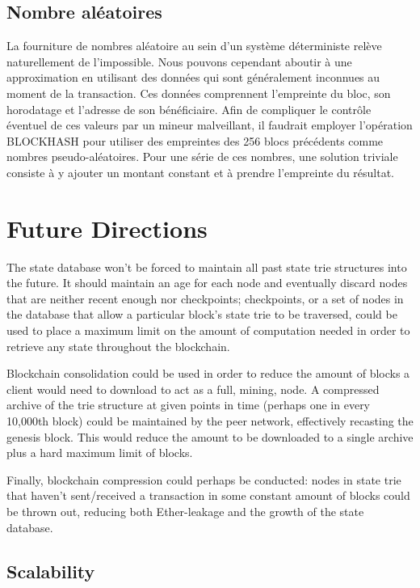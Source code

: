 \documentclass[9pt,oneside]{amsart}
\begin{document}
\begin{multicols}{2}
\subsection{Nombre aléatoires}
La fourniture de nombres aléatoire au sein d'un système déterministe relève naturellement de l'impossible. Nous pouvons cependant aboutir à une approximation en utilisant des données qui sont généralement inconnues au moment de la transaction. Ces données comprennent l'empreinte du bloc, son horodatage et l'adresse de son bénéficiaire. Afin de compliquer le contrôle éventuel de ces valeurs par un mineur malveillant, il faudrait employer l'opération {\small BLOCKHASH} pour utiliser des empreintes des 256 blocs précédents comme nombres pseudo-aléatoires. Pour une série de ces nombres, une solution triviale consiste à y ajouter un montant constant et à prendre l'empreinte du résultat.

\section{Future Directions} \label{ch:future}

The state database won't be forced to maintain all past state trie structures into the future. It should maintain an age for each node and eventually discard nodes that are neither recent enough nor checkpoints; checkpoints, or a set of nodes in the database that allow a particular block's state trie to be traversed, could be used to place a maximum limit on the amount of computation needed in order to retrieve any state throughout the blockchain.

Blockchain consolidation could be used in order to reduce the amount of blocks a client would need to download to act as a full, mining, node. A compressed archive of the trie structure at given points in time (perhaps one in every 10,000th block) could be maintained by the peer network, effectively recasting the genesis block. This would reduce the amount to be downloaded to a single archive plus a hard maximum limit  of blocks.

Finally, blockchain compression could perhaps be conducted: nodes in state trie that haven't sent/received a transaction in some constant amount of blocks could be thrown out, reducing both Ether-leakage and the growth of the state database.

\subsection{Scalability}


\end{multicols}
\end{document}
